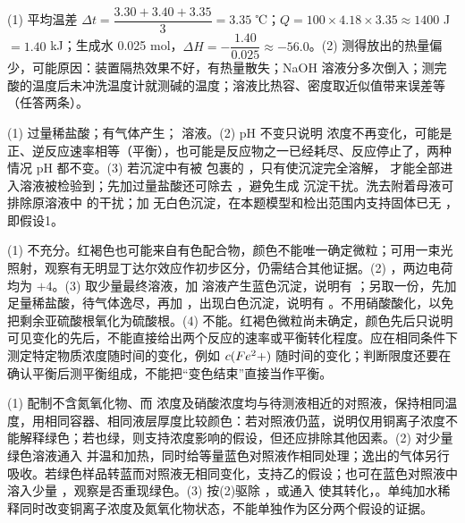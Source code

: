 \begin{jiexilist}
\item (1) 平均温差 $\Delta t=\dfrac{3.30+3.40+3.35}{3}=3.35$ ℃；$Q=100\times4.18\times3.35\approx1400$ J$=1.40$ kJ；生成水 0.025 mol，$\Delta H=-\dfrac{1.40}{0.025}\approx-56.0$\kjmol。(2) 测得放出的热量偏少，可能原因：装置隔热效果不好，有热量散失；NaOH 溶液分多次倒入；测完酸的温度后未冲洗温度计就测碱的温度；溶液比热容、密度取近似值带来误差等（任答两条）。
\item (1) 过量稀盐酸；有气体产生； 溶液。(2) pH 不变只说明  浓度不再变化，可能是正、逆反应速率相等（平衡），也可能是反应物之一已经耗尽、反应停止了，两种情况 pH 都不变。(3) 若沉淀中有被  包裹的 ，只有使沉淀完全溶解， 才能全部进入溶液被检验到；先加过量盐酸还可除去 ，避免生成  沉淀干扰。洗去附着母液可排除原溶液中  的干扰；加  无白色沉淀，在本题模型和检出范围内支持固体已无 ，即假设1。
\item (1) 不充分。红褐色也可能来自有色配合物，颜色不能唯一确定微粒；可用一束光照射，观察有无明显丁达尔效应作初步区分，仍需结合其他证据。(2) ，两边电荷均为 $+4$。(3) 取少量最终溶液，加  溶液产生蓝色沉淀，说明有 ；另取一份，先加足量稀盐酸，待气体逸尽，再加 ，出现白色沉淀，说明有 。不用硝酸酸化，以免把剩余亚硫酸根氧化为硫酸根。(4) 不能。红褐色微粒尚未确定，颜色先后只说明可见变化的先后，不能直接给出两个反应的速率或平衡转化程度。应在相同条件下测定特定物质浓度随时间的变化，例如 $c(Fe^2+)$ 随时间的变化；判断限度还要在确认平衡后测平衡组成，不能把“变色结束”直接当作平衡。
\item (1) 配制不含氮氧化物、而  浓度及硝酸浓度均与待测液相近的对照液，保持相同温度，用相同容器、相同液层厚度比较颜色：若对照液仍蓝，说明仅用铜离子浓度不能解释绿色；若也绿，则支持浓度影响的假设，但还应排除其他因素。(2) 对少量绿色溶液通入  并温和加热，同时给等量蓝色对照液作相同处理；逸出的气体另行吸收。若绿色样品转蓝而对照液无相同变化，支持乙的假设；也可在蓝色对照液中溶入少量 ，观察是否重现绿色。(3) 按(2)驱除 ，或通入  使其转化，。单纯加水稀释同时改变铜离子浓度及氮氧化物状态，不能单独作为区分两个假设的证据。
\end{jiexilist}
